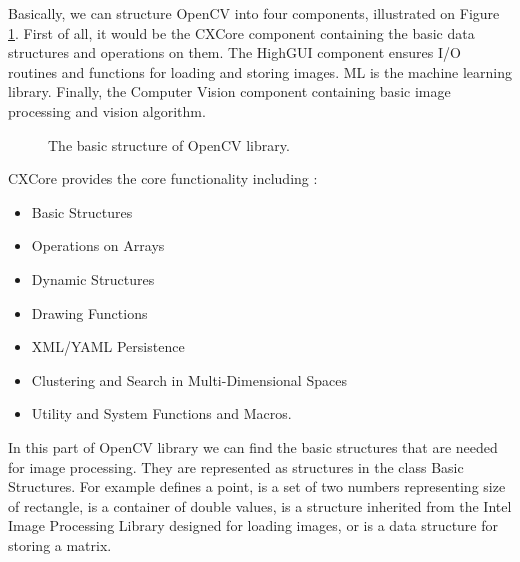 Basically, we can structure OpenCV into four components, illustrated on Figure \ref{fig:opencvstruc}.
First of all, it would be the CXCore component containing the basic data structures and operations on them.
The HighGUI component ensures I/O routines and functions for loading and storing images.
ML is the machine learning library. 
Finally, the Computer Vision component containing basic image processing and vision algorithm.
\begin{figure}[h!]
    \label{fig:opencvstruc} 
    \caption{The basic structure of OpenCV library.}
\end{figure}
CXCore provides the core functionality including :
\begin{itemize}
  \item Basic Structures
  \item Operations on Arrays
  \item Dynamic Structures
  \item Drawing Functions
  \item XML/YAML Persistence
  \item Clustering and Search in Multi-Dimensional Spaces
  \item Utility and System Functions and Macros.
\end{itemize}

In this part of OpenCV library we can find the basic structures that are needed for image processing.
They are represented as structures in the class Basic Structures. For example  defines a point,  is a set of two numbers representing size of rectangle, 
 is a container of double values,  is a structure inherited from the Intel Image Processing Library designed for loading images, 
or  is a data structure for storing a matrix.


